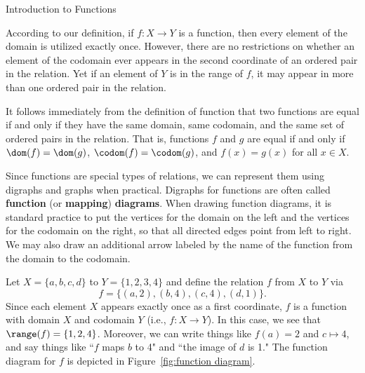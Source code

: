 \begin{section}{Introduction to Functions}

According to our definition, if $f:X\to Y$ is a function, then every element of the domain is utilized exactly once. However, there are no restrictions on whether an element of the codomain ever appears in the second coordinate of an ordered pair in the relation.  Yet if an element of $Y$ is in the range of $f$, it may appear in more than one ordered pair in the relation.

It follows immediately from the definition of function that two functions are equal if and only if they have the same domain, same codomain, and the same set of ordered pairs in the relation. That is, functions $f$ and $g$ are equal if and only if $\dom(f)=\dom(g)$, $\codom(f)=\codom(g)$, and $f(x)=g(x)$ for all $x\in X$.

Since functions are special types of relations, we can represent them using digraphs and graphs when practical. Digraphs for functions are often called \textbf{function} (or \textbf{mapping}) \textbf{diagrams}. When drawing function diagrams, it is standard practice to put the vertices for the domain on the left and the vertices for the codomain on the right, so that all directed edges point from left to right. We may also draw an additional arrow labeled by the name of the function from the domain to the codomain.

\begin{example}\label{ex:function}
Let $X=\{a,b,c,d\}$ to $Y=\{1,2,3,4\}$ and define the relation $f$ from $X$ to $Y$ via
\[
f=\{(a,2),(b,4),(c,4),(d,1)\}.
\]
Since each element $X$ appears exactly once as a first coordinate, $f$ is a function with domain $X$ and codomain $Y$ (i.e., $f:X\to Y$). In this case, we see that $\range(f)=\{1,2,4\}$.  Moreover, we can write things like $f(a)=2$ and $c\mapsto 4$, and say things like ``$f$ maps $b$ to 4" and ``the image of $d$ is 1."  The function diagram for $f$ is depicted in Figure~\ref{fig:function diagram}.
\end{example}


\end{section}
